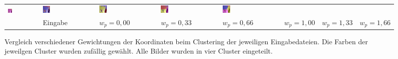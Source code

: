 \begin{figure}[h!]
\begin{tabular}{m{15pt}m{}m{}m{}m{}m{}m{}m{}}
		\includegraphics[width=0.14\textwidth]{images/gen/spatial_weight/p03_04.png_0.33.png} &
		\includegraphics[width=0.14\textwidth]{images/gen/spatial_weight/p03_04.png_0.66.png} &
		\includegraphics[width=0.14\textwidth]{images/gen/spatial_weight/p03_04.png_1.00.png} &
		\includegraphics[width=0.14\textwidth]{images/gen/spatial_weight/p03_04.png_1.33.png} &
		\includegraphics[width=0.14\textwidth]{images/gen/spatial_weight/p03_04.png_1.66.png} \\
		
		&
		\vspace*{2pt}\centering Eingabe & 
		\vspace*{2pt}\centering $w_p=0,00$ &
		\vspace*{2pt}\centering $w_p=0,33$ &
		\vspace*{2pt}\centering $w_p=0,66$ &
		\vspace*{2pt}\centering $w_p=1,00$ &
		\vspace*{2pt}\centering $w_p=1,33$ &
		\vspace*{2pt}\centering $w_p=1,66$
	\end{tabular}
	\caption{Vergleich verschiedener Gewichtungen der Koordinaten beim Clustering der jeweiligen Eingabedateien. Die Farben der jeweilgen Cluster wurden zufällig gewählt. Alle Bilder wurden in vier Cluster eingeteilt.}
	\label{fig:filterbank_weights_pos}
\end{figure}

